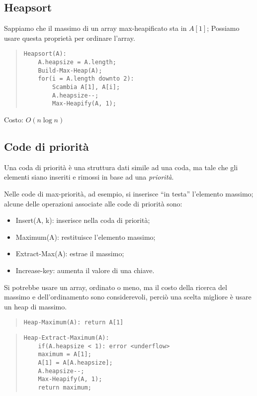 \documentclass[a4paper,10pt]{article}
\theoremstyle{definition}
\begin{document}
\subsection{Heapsort}
Sappiamo che il massimo di un array max-heapificato sta in $A[1]$; Possiamo usare questa proprietà per ordinare l'array.

\begin{quote}
 \begin{lstlisting}
Heapsort(A):
    A.heapsize = A.length;
    Build-Max-Heap(A);
    for(i = A.length downto 2):
        Scambia A[1], A[i];
        A.heapsize--;
        Max-Heapify(A, 1);
 \end{lstlisting}
\end{quote}
Costo: $O(n \log n)$
    
\subsection{Code di priorità}
Una coda di priorità è una struttura dati simile ad una coda, ma tale che gli elementi siano inseriti e rimossi in base ad una \emph{priorità}. \smallskip

Nelle code di max-priorità, ad esempio, si inserisce ``in testa'' l'elemento massimo; alcune delle operazioni associate alle code di priorità sono: 
\begin{itemize}
 \item Insert(A, k): inserisce nella coda di priorità;
 \item Maximum(A): restituisce l'elemento massimo;
 \item Extract-Max(A): estrae il massimo;
 \item Increase-key: aumenta il valore di una chiave.
\end{itemize}

Si potrebbe usare un array, ordinato o meno, ma il costo della ricerca del massimo e dell'ordinamento sono considerevoli, perciò una scelta migliore è usare un heap di massimo.

\begin{quote}
 \begin{lstlisting}
Heap-Maximum(A): return A[1]
 \end{lstlisting}
\end{quote}

\begin{quote}
 \begin{lstlisting}
Heap-Extract-Maximum(A):
    if(A.heapsize < 1): error <underflow>
    maximum = A[1];
    A[1] = A[A.heapsize];
    A.heapsize--;
    Max-Heapify(A, 1);
    return maximum;
 \end{lstlisting}
\end{quote}
\end{document}
